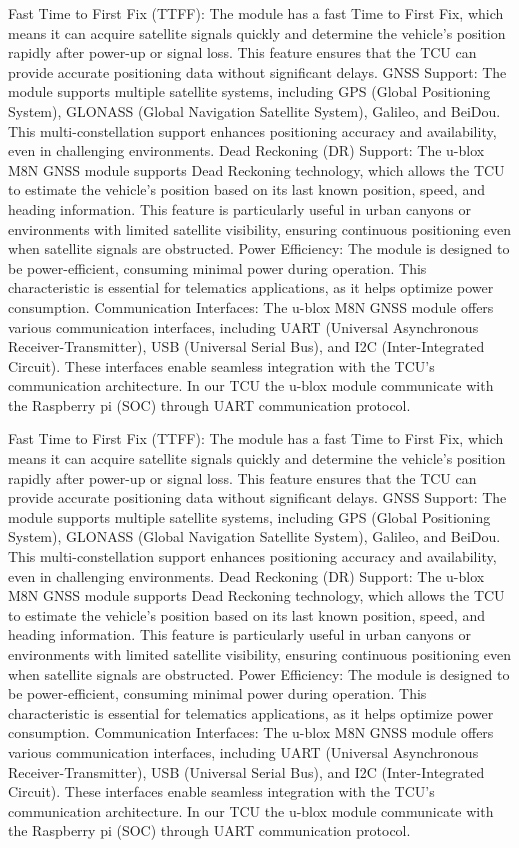 \documentclass[
12pt,
oneside, 
onehalfspacing, 
nolistspacing, 
parskip, 
chapterinoneline, 
]{AASTCOMPUTER}
\begin{document}
Fast Time to First Fix (TTFF): The module has a fast Time to First Fix, which means it can acquire satellite signals quickly and determine the vehicle's position rapidly after power-up or signal loss. This feature ensures that the TCU can provide accurate positioning data without significant delays.
GNSS Support: The module supports multiple satellite systems, including GPS (Global Positioning System), GLONASS (Global Navigation Satellite System), Galileo, and BeiDou. This multi-constellation support enhances positioning accuracy and availability, even in challenging environments.
Dead Reckoning (DR) Support: The u-blox M8N GNSS module supports Dead Reckoning technology, which allows the TCU to estimate the vehicle's position based on its last known position, speed, and heading information. This feature is particularly useful in urban canyons or environments with limited satellite visibility, ensuring continuous positioning even when satellite signals are obstructed.
Power Efficiency: The module is designed to be power-efficient, consuming minimal power during operation. This characteristic is essential for telematics applications, as it helps optimize power consumption.
Communication Interfaces: The u-blox M8N GNSS module offers various communication interfaces, including UART (Universal Asynchronous Receiver-Transmitter), USB (Universal Serial Bus), and I2C (Inter-Integrated Circuit). These interfaces enable seamless integration with the TCU's communication architecture. In our TCU the u-blox module communicate with the Raspberry pi (SOC) through UART communication protocol.

Fast Time to First Fix (TTFF): The module has a fast Time to First Fix, which means it can acquire satellite signals quickly and determine the vehicle's position rapidly after power-up or signal loss. This feature ensures that the TCU can provide accurate positioning data without significant delays.
GNSS Support: The module supports multiple satellite systems, including GPS (Global Positioning System), GLONASS (Global Navigation Satellite System), Galileo, and BeiDou. This multi-constellation support enhances positioning accuracy and availability, even in challenging environments.
Dead Reckoning (DR) Support: The u-blox M8N GNSS module supports Dead Reckoning technology, which allows the TCU to estimate the vehicle's position based on its last known position, speed, and heading information. This feature is particularly useful in urban canyons or environments with limited satellite visibility, ensuring continuous positioning even when satellite signals are obstructed.
Power Efficiency: The module is designed to be power-efficient, consuming minimal power during operation. This characteristic is essential for telematics applications, as it helps optimize power consumption.
Communication Interfaces: The u-blox M8N GNSS module offers various communication interfaces, including UART (Universal Asynchronous Receiver-Transmitter), USB (Universal Serial Bus), and I2C (Inter-Integrated Circuit). These interfaces enable seamless integration with the TCU's communication architecture. In our TCU the u-blox module communicate with the Raspberry pi (SOC) through UART communication protocol.
\end{document}
